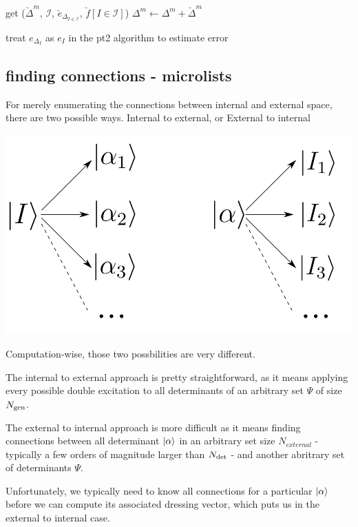 \documentclass[./thesis.tex]{subfiles}
\begin{document}
\begin{algorithm}
	get ($\breve \Delta^m$, $\mathcal{I}$, $\breve e_{\Delta_{I \in \mathcal{I}}}$, $\breve f[I \in \mathcal{I}]$) \;
	$\Delta^m \gets \Delta^m + \breve \Delta^m$ \;
	
	treat $e_{\Delta_{I}}$ as $e_I$ in the pt2 algorithm to estimate error \;
\end{algorithm}

\subsection{finding connections - microlists}


For merely enumerating the connections between internal and external space, there are two possible ways.
Internal to external, or External to internal
	\begin{center}
		\includegraphics[width=0.5\columnwidth]{figures/matrix_dressing/interactions}
	\end{center}

Computation-wise, those two possbilities are very different.


The internal to external approach is pretty straightforward, as it means applying every possible double excitation to all determinants of an arbitrary set $\Psi$ of size ${N_\text{gen}}$. 


The external to internal approach is more difficult as it means finding connections between all determinant ${\ket{\alpha}}$ in an arbitrary set size $N_{external}$ - typically a few orders of magnitude larger than ${N_\text{det}}$ - and another abritrary set of determinants $\Psi$. 

Unfortunately, we typically need to know all connections for a particular ${\ket{\alpha}}$ before we can compute its associated dressing vector, which puts us in the external to internal case.
\end{document}
